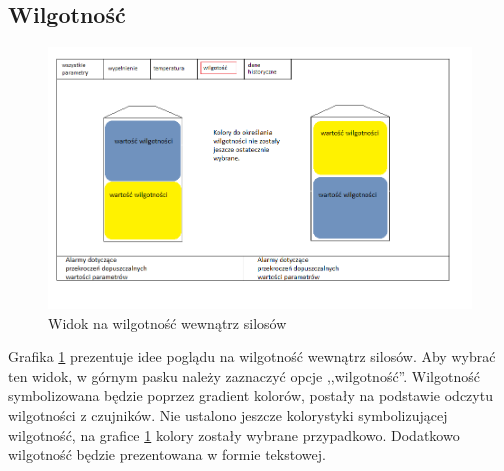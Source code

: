    \subsection{Wilgotność}
        \begin{figure}[H]
            \centering
            \includegraphics[width = \textwidth]{obrazy/projekt_grafiki/wilgotność.png}
            \caption{Widok na wilgotność wewnątrz silosów}
            \label{fig: wilgotnosc}
        \end{figure}
        Grafika \ref{fig: wilgotnosc} prezentuje idee poglądu na wilgotność wewnątrz silosów. Aby wybrać ten widok,
        w górnym pasku należy zaznaczyć opcje ,,wilgotność''. Wilgotność symbolizowana będzie poprzez gradient kolorów,
        postały na podstawie odczytu wilgotności z czujników. Nie ustalono jeszcze kolorystyki symbolizującej wilgotność, na grafice \ref{fig: wilgotnosc} kolory zostały wybrane przypadkowo. Dodatkowo wilgotność będzie prezentowana w formie 
        tekstowej.

